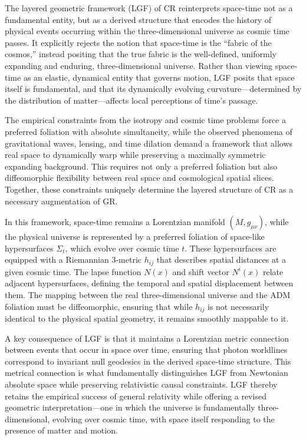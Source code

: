 \documentclass[aps,prd,reprint,superscriptaddress]{revtex4-2}
\begin{document}
The layered geometric framework (LGF) of CR reinterprets space-time not as a fundamental entity, but as a derived structure that encodes the history of physical events occurring within the three-dimensional universe as cosmic time passes. It explicitly rejects the notion that space-time is the ``fabric of the cosmos,'' instead positing that the true fabric is the well-defined, uniformly expanding and enduring, three-dimensional universe. Rather than viewing space-time as an elastic, dynamical entity that governs motion, LGF posits that space itself is fundamental, and that its dynamically evolving curvature---determined by the distribution of matter---affects local perceptions of time's passage. 

The empirical constraints from the isotropy and cosmic time problems force a preferred foliation with absolute simultaneity, while the observed phenomena of gravitational waves, lensing, and time dilation demand a framework that allows real space to dynamically warp while preserving a maximally symmetric expanding background. This requires not only a preferred foliation but also diffeomorphic flexibility between real space and cosmological spatial slices. Together, these constraints uniquely determine the layered structure of CR as a necessary augmentation of GR.

In this framework, space-time remains a Lorentzian manifold \( (M, g_{\mu\nu}) \), while the physical universe is represented by a preferred foliation of space-like hypersurfaces \( \Sigma_t \), which evolve over cosmic time \( t \). These hypersurfaces are equipped with a Riemannian 3-metric \( h_{ij} \) that describes spatial distances at a given cosmic time. The lapse function \( N(x) \) and shift vector \( N^i(x) \) relate adjacent hypersurfaces, defining the temporal and spatial displacement between them. The mapping between the real three-dimensional universe and the ADM foliation must be diffeomorphic, ensuring that while \( h_{ij} \) is not necessarily identical to the physical spatial geometry, it remains smoothly mappable to it. 

A key consequence of LGF is that it maintains a Lorentzian metric connection between events that occur in space over time, ensuring that photon worldlines correspond to invariant null geodesics in the derived space-time structure. This metrical connection is what fundamentally distinguishes LGF from Newtonian absolute space while preserving relativistic causal constraints. LGF thereby retains the empirical success of general relativity while offering a revised geometric interpretation---one in which the universe is fundamentally three-dimensional, evolving over cosmic time, with space itself responding to the presence of matter and motion.
\end{document}

